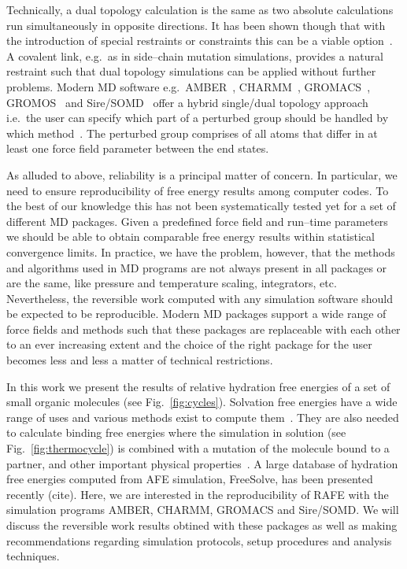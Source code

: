 \documentclass[journal=jctcce,manuscript=article]{achemso}
\begin{document}
Technically, a dual topology calculation is the same as two absolute
calculations run simultaneously in opposite directions.  It has been
shown though that with the introduction of special restraints or
constraints this can be a viable option~\cite{doi:10.1021/ct700081t,
  rocklin_separated_2013}.  A covalent link, e.g.\ as in side--chain
mutation simulations, provides a natural restraint such that dual
topology simulations can be applied without further problems.  Modern
MD software e.g.\ AMBER~\cite{case_amber_2005},
CHARMM~\cite{JCC:JCC21287}, GROMACS~\cite{Abraham201519},
GROMOS~\cite{doi:10.1021/jp984217f} and Sire/SOMD~\cite{Sire-2016,
  doi:10.1021/ct300857j} offer a hybrid single/dual topology approach
i.e.\ the user can specify which part of a perturbed group should be
handled by which method~\cite{doi:10.1021/jp994193s}.  The perturbed
group comprises of all atoms that differ in at least one force field
parameter between the end states.

As alluded to above, reliability is a principal matter of concern.  In
particular, we need to ensure reproducibility of free energy results
among computer codes.  To the best of our knowledge this has not been
systematically tested yet for a set of different MD packages.  Given a
predefined force field and run--time parameters we should be able to
obtain comparable free energy results within statistical convergence
limits.  In practice, we have the problem, however, that the methods
and algorithms used in MD programs are not always present in all
packages or are the same, like pressure and temperature scaling,
integrators, etc.  Nevertheless, the reversible work computed with any
simulation software should be expected to be reproducible.  Modern MD
packages support a wide range of force fields and methods such that
these packages are replaceable with each other to an ever increasing
extent and the choice of the right package for the user becomes less
and less a matter of technical restrictions.

In this work we present the results of relative hydration free
energies of a set of small organic molecules (see
Fig.~\ref{fig:cycles}).  Solvation free energies have a wide range of
uses and various methods exist to compute
them~\cite{Skyner:2015:PCCP}.  They are also needed to calculate
binding free energies where the simulation in solution (see
Fig.~\ref{fig:thermocycle}) is combined with a mutation of the
molecule bound to a partner, and other important physical
properties~\cite{Skyner:2015:PCCP}.  A large database of hydration
free energies computed from AFE simulation, FreeSolve, has been
presented recently (cite). Here, we are interested in the
reproducibility of RAFE with the simulation programs AMBER, CHARMM,
GROMACS and Sire/SOMD.  We will discuss the reversible work results
obtined with these packages as well as making recommendations
regarding simulation protocols, setup procedures and analysis
techniques.
\end{document}
